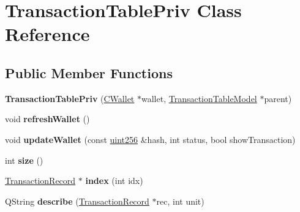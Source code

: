 \hypertarget{class_transaction_table_priv}{}\section{Transaction\+Table\+Priv Class Reference}
\label{class_transaction_table_priv}
\subsection*{Public Member Functions}
\begin{DoxyCompactItemize}
\item 
\mbox{\label{class_transaction_table_priv_a19c3442de869b47471ab3a1989a5a746}} 
{\bfseries Transaction\+Table\+Priv} (\mbox{\hyperlink{class_c_wallet}{C\+Wallet}} $\ast$wallet, \mbox{\hyperlink{class_transaction_table_model}{Transaction\+Table\+Model}} $\ast$parent)
\item 
\mbox{\label{class_transaction_table_priv_a1f81da5d7cfb2aac03a5e18e6bc91792}} 
void {\bfseries refresh\+Wallet} ()
\item 
\mbox{\label{class_transaction_table_priv_a5a8454ce91251c4d9eb927bf2850745c}} 
void {\bfseries update\+Wallet} (const \mbox{\hyperlink{classuint256}{uint256}} \&hash, int status, bool show\+Transaction)
\item 
\mbox{\label{class_transaction_table_priv_acc5c85ae550eca3a35b7b4d68d0994bf}} 
int {\bfseries size} ()
\item 
\mbox{\label{class_transaction_table_priv_ac692aa6aa7820e80accc971c70e0fae5}} 
\mbox{\hyperlink{class_transaction_record}{Transaction\+Record}} $\ast$ {\bfseries index} (int idx)
\item 
\mbox{\label{class_transaction_table_priv_ab08d44e16bf6dd95b5b83959b3013780}} 
Q\+String {\bfseries describe} (\mbox{\hyperlink{class_transaction_record}{Transaction\+Record}} $\ast$rec, int unit)
\end{DoxyCompactItemize}
